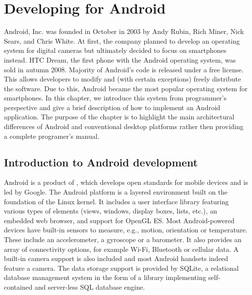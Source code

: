 \chapter{Developing for Android}
\label{chap:android}

Android, Inc\@. was founded in October in 2003 by Andy Rubin, Rich Miner, Nick Sears, and Chris White. 
At first, the company planned to develop an operating system for digital cameras %
but ultimately %
decided to focus on smartphones instead. %
HTC Dream, the first phone with the Android operating system, was sold in autumn 2008.
Majority of Android's code is released under a free license. 
This allows developers to modify and (with certain exceptions) freely distribute the software.
Due to this, Android became the most popular operating system for smartphones.
In this chapter, we introduce this system from programmer's perspective and give a brief description of how to implement an Android application.
The purpose of the chapter is to highlight the main architectural differences of Android and conventional desktop platforms rather then providing a complete programer's manual. 

\section{Introduction to Android development}

Android is a product of , which develops open standards for mobile devices and is led by Google.
The Android platform is a layered environment built on the foundation of the Linux kernel.
It includes a user interface library featuring various types of elements (views, windows, display boxes, lists, etc.),  
an embedded web browser, and support for OpenGL ES.
Most Android-powered devices have built-in sensors to measure, e.g., motion, orientation or temperature. 
These include an accelerometer, a gyroscope or a barometer.
It also provides an array of connectivity options, for example Wi-Fi, Bluetooth or cellular data.
A built-in camera support is also included and most Android handsets indeed feature a camera. 
The data storage support is provided by SQLite, a relational database management system in the form of a library implementing self-contained and server-less SQL database engine.
 

